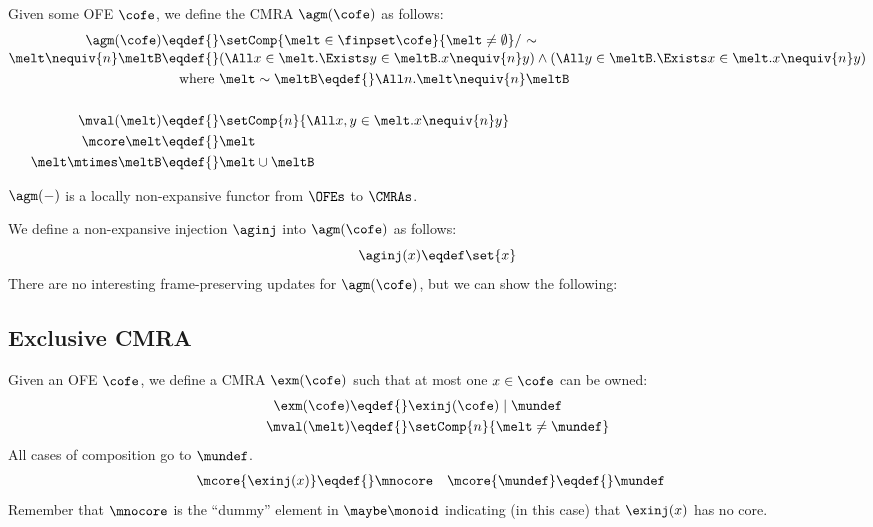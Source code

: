 Given some OFE $\cofe$, we define the CMRA $\agm(\cofe)$ as follows:
\begin{align*}
  \agm(\cofe) \eqdef{}& \setComp{\melt \in \finpset\cofe}{\melt \neq \emptyset} /\ {\sim} \\[-0.2em]
  \melt \nequiv{n} \meltB \eqdef{}& (\All x \in \melt. \Exists y \in \meltB. x \nequiv{n} y) \land (\All y \in \meltB. \Exists x \in \melt. x \nequiv{n} y) \\
  \textnormal{where }& \melt \sim \meltB \eqdef{} \All n. \melt \nequiv{n} \meltB  \\
~\\
  \mval(\melt) \eqdef{}& \setComp{n}{ \All x, y \in \melt. x \nequiv{n} y } \\
  \mcore\melt \eqdef{}& \melt \\
  \melt \mtimes \meltB \eqdef{}& \melt \cup \meltB
\end{align*}

$\agm(-)$ is a locally non-expansive functor from $\OFEs$ to $\CMRAs$.

We define a non-expansive injection $\aginj$ into $\agm(\cofe)$ as follows:
\[ \aginj(x) \eqdef \set{x} \]
There are no interesting frame-preserving updates for $\agm(\cofe)$, but we can show the following:
\begin{mathpar}

  
\end{mathpar}


\subsection{Exclusive CMRA}

Given an OFE $\cofe$, we define a CMRA $\exm(\cofe)$ such that at most one $x \in \cofe$ can be owned:
\begin{align*}
  \exm(\cofe) \eqdef{}& \exinj(\cofe) \mid \mundef \\
  \mval(\melt) \eqdef{}& \setComp{n}{\melt \neq \mundef}
\end{align*}
All cases of composition go to $\mundef$.
\begin{align*}
  \mcore{\exinj(x)} \eqdef{}& \mnocore &
  \mcore{\mundef} \eqdef{}& \mundef
\end{align*}
Remember that $\mnocore$ is the ``dummy'' element in $\maybe\monoid$ indicating (in this case) that $\exinj(x)$ has no core.

